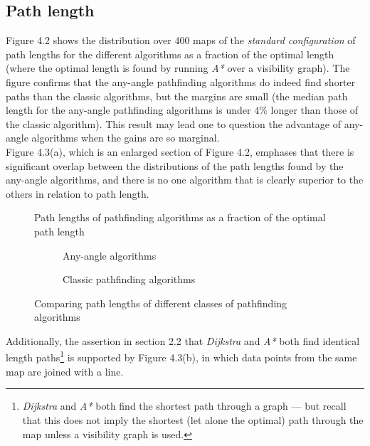 \documentclass[12pt,notitlepage]{report}
\begin{document}
\subsection{Path length}
Figure 4.2 shows the distribution over 400 maps of the {\em standard configuration} of path lengths for the different algorithms  as a fraction of the optimal length (where the optimal length is found by running {\em A*} over a visibility graph).  The figure confirms that the any-angle pathfinding algorithms do indeed find shorter paths than the classic algorithms, but the margins are small (the median path length for the any-angle pathfinding algorithms is under $4\%$ longer than those of the classic algorithm). This result may lead one to question the advantage of any-angle algorithms when the gains are so marginal.\\

\noindent
Figure 4.3(a), which is an enlarged section of Figure 4.2, emphases that there is significant overlap between the distributions of the path lengths found by the any-angle algorithms, and there is no one algorithm that is clearly superior to the others in relation to path length.\\

\begin{figure}
\centering

\caption[Path lengths computed by pathfinding algorithms]{Path lengths of pathfinding algorithms as a fraction of the optimal path length}
\end{figure}

\begin{figure}
\centering
  \begin{subfigure}{0.49\textwidth}
  \centering
  
  \caption{Any-angle algorithms}
  \end{subfigure}
  \begin{subfigure}{0.49\textwidth}
  \centering
  
  \caption{Classic pathfinding algorithms}
  \end{subfigure}
\caption{Comparing path lengths of different classes of pathfinding algorithms}
\end{figure}

\noindent
Additionally, the assertion in section 2.2 that {\em Dijkstra} and {\em A*} both find identical length paths\footnote{{\em Dijkstra} and {\em A*} both find the shortest path through a graph --- but recall that this does not imply the shortest (let alone the optimal) path through the map unless a visibility graph is used.} is supported by Figure 4.3(b), in which data points from the same map are joined with a line.
\end{document}
